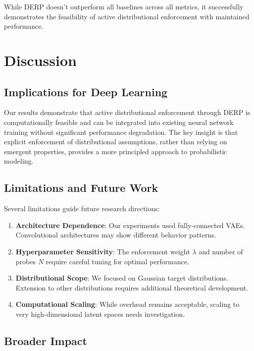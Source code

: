 \documentclass{article}
\begin{document}
While DERP doesn't outperform all baselines across all metrics, it successfully demonstrates the feasibility of active distributional enforcement with maintained performance.

\section{Discussion}

\subsection{Implications for Deep Learning}

Our results demonstrate that active distributional enforcement through DERP is computationally feasible and can be integrated into existing neural network training without significant performance degradation. The key insight is that explicit enforcement of distributional assumptions, rather than relying on emergent properties, provides a more principled approach to probabilistic modeling.

\subsection{Limitations and Future Work}

Several limitations guide future research directions:

\begin{enumerate}
    \item \textbf{Architecture Dependence}: Our experiments used fully-connected VAEs. Convolutional architectures may show different behavior patterns.
    
    \item \textbf{Hyperparameter Sensitivity}: The enforcement weight $\lambda$ and number of probes $N$ require careful tuning for optimal performance.
    
    \item \textbf{Distributional Scope}: We focused on Gaussian target distributions. Extension to other distributions requires additional theoretical development.
    
    \item \textbf{Computational Scaling}: While overhead remains acceptable, scaling to very high-dimensional latent spaces needs investigation.
\end{enumerate}

\subsection{Broader Impact}
\end{document}
